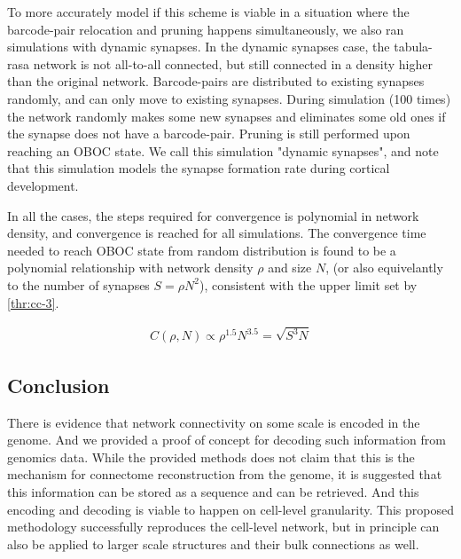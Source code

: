 \documentclass[../dissertation.tex]{subfiles}
\begin{document}
To more accurately model if this scheme is viable in a situation where the barcode-pair relocation and pruning happens simultaneously, we also ran simulations with dynamic synapses.
In the dynamic synapses case, the tabula-rasa network is not all-to-all connected, but still connected in a density higher than the original network.
Barcode-pairs are distributed to existing synapses randomly, and can only move to existing synapses.
During simulation (100 times) the network randomly makes some new synapses and eliminates some old ones if the synapse does not have a barcode-pair.
Pruning is still performed upon reaching an OBOC state.
We call this simulation "dynamic synapses", and note that this simulation models the synapse formation rate during cortical development.~\cite{connclone08,connclone09}

In all the cases, the steps required for convergence is polynomial in network density, and convergence is reached for all simulations.
The convergence time needed to reach OBOC state from random distribution is found to be a polynomial relationship with network density $\rho$ and size $N$, (or also equivelantly to the number of synapses $S = \rho N^2$), consistent with the upper limit set by \cref{thr:cc-3}.

\begin{align}
    C \left( \rho , N \right) \propto \rho^{1.5} N^{3.5} = \sqrt{ S^3 N }
\end{align}

\subsection{Conclusion}

There is evidence that network connectivity on some scale is encoded in the genome.
And we provided a proof of concept for decoding such information from genomics data.
While the provided methods does not claim that this is the mechanism for connectome reconstruction from the genome, it is suggested that this information can be stored as a sequence and can be retrieved.
And this encoding and decoding is viable to happen on cell-level granularity.
This proposed methodology successfully reproduces the cell-level network, but in principle can also be applied to larger scale structures and their bulk connections as well.
\end{document}
